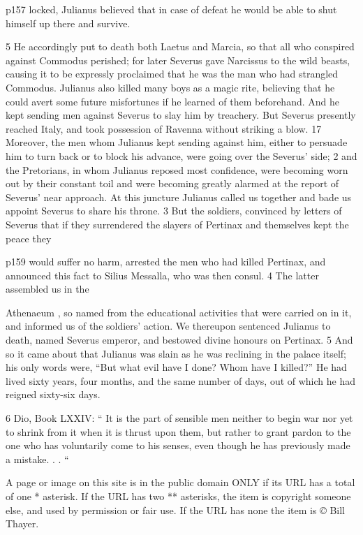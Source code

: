 p157 locked, Julianus believed that in case of defeat he would be able to shut himself up there and survive.

5
He accordingly put to death both Laetus and Marcia, so that all who conspired against Commodus perished; for later Severus gave Narcissus to the wild beasts, causing it to be expressly proclaimed that he was the man who had strangled Commodus. Julianus also killed many boys as a magic rite, believing that he could avert some future misfortunes if he learned of them beforehand. And he kept sending men against Severus to slay him by treachery. But Severus presently reached Italy, and took possession of Ravenna without striking a blow.
17
Moreover, the men whom Julianus kept sending against him, either to persuade him to turn back or to block his advance, were going over the Severus' side; 2 and the Pretorians, in whom Julianus reposed most confidence, were becoming worn out by their constant toil and were becoming greatly alarmed at the report of Severus' near approach. At this juncture Julianus called us together and bade us appoint Severus to share his throne. 3 But the soldiers, convinced by letters of Severus that if they surrendered the slayers of Pertinax and themselves kept the peace they

p159 would suffer no harm, arrested the men who had killed Pertinax, and announced this fact to Silius Messalla, who was then consul. 4 The latter assembled us in the

Athenaeum , so named from the educational activities that were carried on in it, and informed us of the soldiers' action. We thereupon sentenced Julianus to death, named Severus emperor, and bestowed divine honours on Pertinax. 5 And so it came about that Julianus was slain as he was reclining in the palace itself; his only words were, ``But what evil have I done? Whom have I killed?'' He had lived sixty years, four months, and the same number of days, out of which he had reigned sixty-six days.

6
Dio, Book LXXIV: `` It is the part of sensible men neither to begin war nor yet to shrink from it when it is thrust upon them, but rather to grant pardon to the one who has voluntarily come to his senses, even though he has previously made a mistake. . . ``

A page or image on this site is in the public domain ONLY if its URL has a total of one * asterisk. If the URL has two ** asterisks, the item is copyright someone else, and used by permission or fair use. If the URL has none the item is \emph{©} Bill Thayer.

